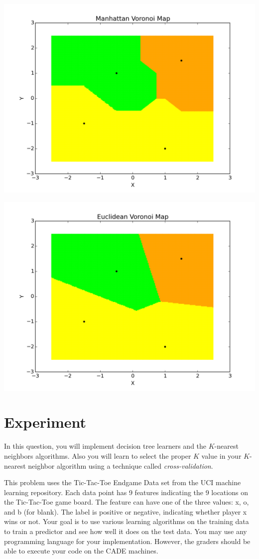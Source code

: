 \documentclass[listings, listings-bw, listings-color, listings-sv]{article}
\begin{document}
\includegraphics[height=8 cm \centering]{./images/NN_3c1.png}

\includegraphics[height=8 cm \centering]{./images/NN_3c2.png}

\section{Experiment}
\label{sec-3}

In  this  question,  you  will  implement  decision  tree  learners  and  the  $K$-nearest  neighbors algorithms.   Also  you  will  learn  to  select  the  proper $K$ value  in  your $K$-nearest  neighbor algorithm using a technique called \emph{cross-validation}.

This problem uses the Tic-Tac-Toe Endgame Data set from the UCI machine learning repository.   Each  data  point  has  9  features  indicating  the  9  locations  on  the  Tic-Tac-Toe game board.  The feature can have one of the three values:  x, o, and b (for blank).  The label is positive or negative, indicating whether player x wins or not. Your goal is to use various learning algorithms on the training data to train a predictor and see how well it does on the test data. You may use any programming language for your implementation.  However, the graders should be able to execute your code on the CADE machines.
\end{document}
